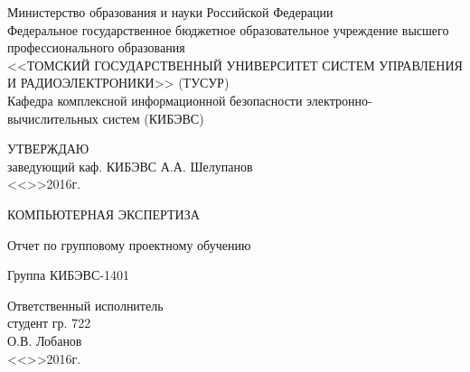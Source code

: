 \newpage
{}

\begin{center}
 Министерство образования и науки Российской Федерации\\
 Федеральное государственное бюджетное образовательное учреждение высшего профессионального образования\\
 <<ТОМСКИЙ ГОСУДАРСТВЕННЫЙ УНИВЕРСИТЕТ СИСТЕМ УПРАВЛЕНИЯ И РАДИОЭЛЕКТРОНИКИ>> (ТУСУР)\\
 Кафедра комплексной информационной безопасности электронно-вычислительных систем (КИБЭВС)\\
\end{center}

\vfill

\begin{flushright}
\begin{minipage}{0.45\textwidth}
 \begin{flushleft}
  УТВЕРЖДАЮ\\
  заведующий каф. КИБЭВС
  \underline{\hspace{3cm}}А.А. Шелупанов \\
  <<\underline{\hspace{1cm}}>>\underline{\hspace{3cm}}2016г.\\
 \end{flushleft}
\end{minipage}
\end{flushright}

\vfill

\begin{center}
КОМПЬЮТЕРНАЯ ЭКСПЕРТИЗА

Отчет по групповому проектному обучению

Группа КИБЭВС-1401
\end{center}

\vfill
\begin{flushright}
\begin{minipage}{0.45\textwidth}
 \begin{flushleft}
  Ответственный исполнитель \\
  студент гр. 722 \\
  \underline{\hspace{3cm}}О.В. Лобанов \\
  <<\underline{\hspace{1cm}}>>\underline{\hspace{3cm}}2016г.\\
 \end{flushleft}
\end{minipage}
\end{flushright}

